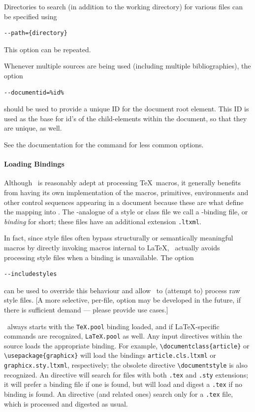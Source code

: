 \documentclass{book}
\begin{document}
Directories to search (in addition to the working directory)
for various files can be specified using
\begin{lstlisting}[style=shell]
--path={directory}
\end{lstlisting}
This option can be repeated.

Whenever multiple sources are being used (including multiple bibliographies),
the option
\begin{lstlisting}[style=shell]
--documentid=%id%
\end{lstlisting}
should be used to provide a unique ID for the document root element.
This ID is used as the base for id's of the child-elements within the document,
so that they are unique, as well.

See the documentation for the command  for
less common options.

\paragraph{Loading Bindings}\label{usage.conversion.loading}
Although \LaTeXML\ is reasonably adept at processing \TeX\ macros,
it generally benefits from having its own implementation of
the macros, primitives, environments and other control sequences
appearing in a document because these are what define the mapping into \XML.
The \LaTeXML-analogue of a style or class file we call a
\LaTeXML-binding file, or \emph{binding} for short;
these files have an additional extension \texttt{.ltxml}.

In fact, since style files often bypass structurally or semantically
meaningful macros by directly invoking macros internal to \LaTeX,
\LaTeXML\ actually avoids processing style files when a binding is unavailable.
The option
\begin{lstlisting}[style=shell]
--includestyles
\end{lstlisting}
can be used to override this behaviour and allow \LaTeXML\ to
(attempt to) process raw style files.
[A more selective, per-file, option may be developed in the future,
if there is sufficient demand --- please provide use cases.]

\LaTeXML\ always starts with the \texttt{TeX.pool} binding loaded,
and if \LaTeX-specific commands are recognized, \texttt{LaTeX.pool} as well.
Any input directives within the source loads the appropriate binding.
For example, \verb|\documentclass{article}| or \verb|\usepackage{graphicx}|
will load the bindings \texttt{article.cls.ltxml} or \texttt{graphicx.sty.ltxml},
respectively; the obsolete directive \verb|\documentstyle|
is also recognized.
An \verb|| directive will search for
files with both \texttt{.tex} and \texttt{.sty} extensions;
it will prefer a binding file if one is found,
but will load and digest a \texttt{.tex} if no binding is found.
An \verb|| directive (and related ones) search only for
a \texttt{.tex} file, which is processed and digested as usual.
\end{document}
